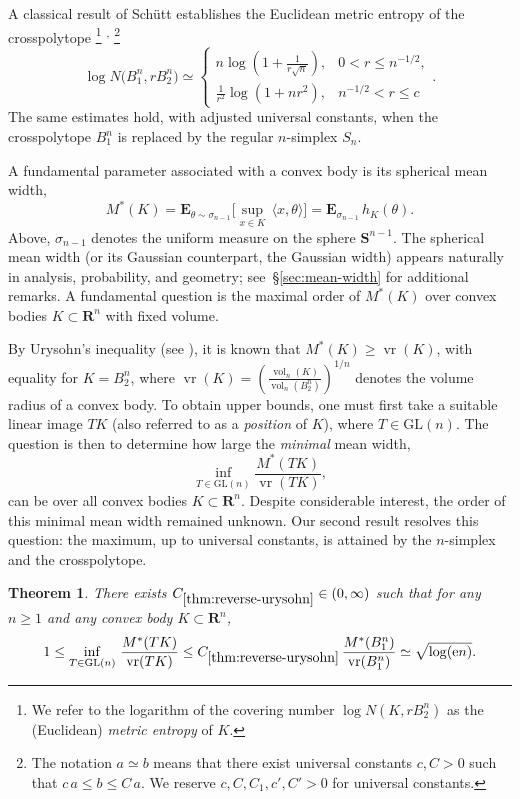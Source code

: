 \documentclass[11pt]{amsart}
\newcommand{\R}{\mathbf R}
\newcommand{\sphere}{\mathbf{S}^{n-1}}
\newcommand{\E}{\mathbf E}
\newcommand{\Vol}{\operatorname{vol}}
\newcommand{\GL}{\mathrm{GL}}
\newcommand{\vrad}{\operatorname{vr}}
\let\vr\vrad
\newcommand{\1}{\mathbf 1}
\newcommand{\e}{\mathrm{e}}
\let\vol\Vol
\theoremstyle{plain}
\newtheorem{theorem}{Theorem}[section]
\begin{document}
A classical result of Sch\"{u}tt \cite{Sch84}
establishes the Euclidean metric entropy of the 
crosspolytope%
\footnote{We refer to the logarithm of the covering number $\log N(K, rB^n_2)$ as the (Euclidean) \emph{metric entropy} of $K$.}%
\textsuperscript{,}%
\footnote{The notation $a \simeq b$ means that there exist universal constants
$c,C>0$ such that
$
c\,a\leq b\leq C\,a.
$
We reserve $c,C,C_{1}, c', C' >0$ for universal constants.}
\begin{equation}
\label{Carsten}
\log N\bigl(B_{1}^{n},rB_{2}^{n}\bigr)
\simeq 
\begin{cases}
n\log\left(1+\frac{1}{r\sqrt{n}}\right),
& 0<r\leq n^{-1/2}, \\
\frac{1}{r^{2}}\log\left(1+nr^{2}\right),
& n^{-1/2}<r\leq c
\end{cases}.
\end{equation}
The same estimates hold, with adjusted universal constants, when the crosspolytope $B_{1}^{n}$ is replaced by the regular $n$-simplex $S_{n}$.

A fundamental parameter associated with a convex body
is its spherical mean width, 
\[
M^\ast(K) = \E_{\theta \sim \sigma_{n-1}} \Big[ \sup_{x \in K} \, \langle x, \theta \rangle \Big]
= \E_{\sigma_{n-1}} \, h_K(\theta).
\]
Above, $\sigma_{n-1}$ denotes the uniform measure on the sphere $\sphere$. The spherical mean width (or its Gaussian counterpart, the Gaussian width) appears naturally in analysis, probability, and geometry; see~\S\ref{sec:mean-width} for additional remarks. A fundamental question is the maximal order of $M^\ast(K)$ over convex bodies $K\subset \R^n$ with fixed volume.

By Urysohn's inequality (see \cite {Sch14}), it is known that
$M^\ast(K) \geq \vr(K)$, with equality for $K = B^n_2$, where $\vr(K) = (\tfrac{\vol_n(K)}{\vol_n(B^n_2)})^{1/n}$ denotes the volume radius of a convex body. 
To obtain upper bounds, one must first take a suitable linear image $TK$ (also referred to as a \emph{position} of $K$), where $T \in \GL(n)$. The question is then to determine how large the \emph{minimal} mean width,
\[
\inf_{T\in \GL(n)} \frac{ M^\ast(TK) }{ \vr(TK)},
\]
can be over all convex bodies $K \subset \R^n$.
Despite considerable interest, the order of this minimal mean width remained unknown.
Our second result resolves this question: the maximum, up to universal constants, is attained by the $n$-simplex and the crosspolytope.

\begin{theorem}
\label{thm:reverse-urysohn}
There exists $C_{\ref{thm:reverse-urysohn}} \in (0, \infty)$ such that for any $n \geq 1$ and any convex body $K\subset\R^{n}$,
\begin{equation}
\label{THM2-1}
1\leq \inf_{T \in \GL(n)} \, 
\frac{M^\ast(TK)}{{\rm vr}(TK)}
\leq C_{\ref{thm:reverse-urysohn}} \, \frac{M^\ast (B_1^n)}{{\rm vr} (B_1^n)}  \simeq
\sqrt{\log(\e n)}.
\end{equation}
\end{theorem}
\end{document}
